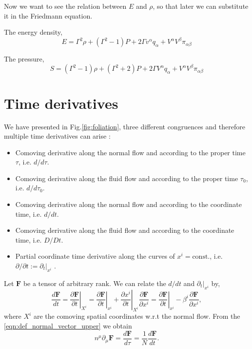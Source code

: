 Now we want to see the relation between $E$ and $\rho$, so that later we can substitute it in the Friedmann equation.

The energy density,
\begin{equation}
    E=\Gamma^2 \rho + (\Gamma^2-1)P+2\Gamma v^\alpha q_\alpha + V^\alpha V^\beta \pi_{\alpha\beta}
    \label{eqn:general_energy_fluid_normal}
\end{equation}

The pressure,
\begin{equation}
    S=(\Gamma^2-1)\rho + (\Gamma^2+2)P+2\Gamma V^\alpha q_\alpha + V^\alpha V^\beta \pi_{\alpha\beta}
    \label{eqn:general_shear_fluid_normal}
\end{equation}




\section{Time derivatives}


We have presented in Fig.\eqref{fig:foliation}, three different congruences and therefore multiple time derivatives can arise \cite{Buchert_2020}:
\begin{itemize}
    \item Comoving derivative along the normal flow and according to the proper time $\tau$, i.e. $d/d\tau$.
    \item Comoving derivative along the fluid flow and according to the proper time $\tau_0$, i.e. $d/d\tau_0$.
    \item Comoving derivative along the normal flow and according to the coordinate time, i.e. $d/dt$.
    \item Comoving derivative along the fluid flow and according to the coordinate time, i.e. $D/Dt$.
    \item Partial coordinate time derivative along the curves of $x^i=\text{const.}$, i.e. $\partial/\partial t:=\partial_t|_{x^i}$ .
\end{itemize}

Let $\mathbf{F}$ be a tensor of arbitrary rank. We can relate the $d/dt$ and $\partial_t|_{x^i}$ by,
\begin{equation}
    \frac{d\mathbf{F}}{dt}=\left.\frac{\partial \mathbf{F}}{\partial t}\right|_{X^i}=\left.\frac{\partial \mathbf{F}}{\partial t}\right|_{x^i}+\left.\frac{\partial x^i}{\partial t}\right|_{X^i}\frac{\partial \mathbf{F}}{\partial x^i}=\left.\frac{\partial \mathbf{F}}{\partial t}\right|_{x^i}-\beta^i\frac{\partial \mathbf{F}}{\partial x^i},
    \label{eqn:normal_total_time_expression}
\end{equation}
where $X^i$ are the comoving spatial coordinates w.r.t the normal flow. From the \cref{eqn:def_normal_vector_upper} we obtain
\begin{equation}
    n^\mu\partial_\mu \mathbf{F}=\frac{d\mathbf{F}}{d\tau}=\frac{1}{N}\frac{d\mathbf{F}}{dt}.
    \label{eqn:relation_total_time_normal_vec}
\end{equation}

